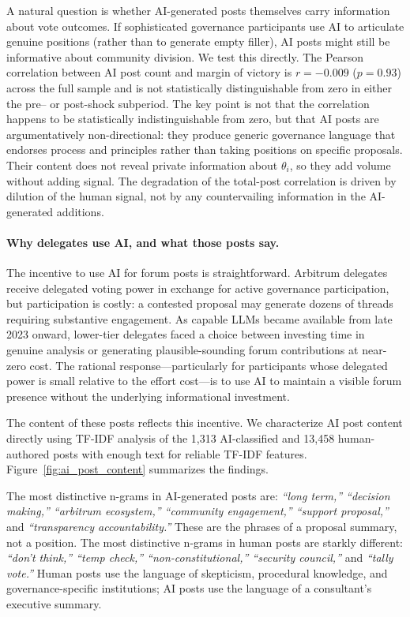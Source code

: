 \documentclass[12pt]{article}
\begin{document}
A natural question is whether AI-generated posts themselves carry information
about vote outcomes. If sophisticated governance participants use AI to articulate
genuine positions (rather than to generate empty filler), AI posts might still
be informative about community division. We test this directly. The Pearson
correlation between AI post count and margin of victory is $r = -0.009$
($p = 0.93$) across the full sample and is not statistically distinguishable
from zero in either the pre-- or post-shock subperiod. The key point is not that the correlation happens to be statistically
indistinguishable from zero, but that AI posts are argumentatively non-directional:
they produce generic governance language that endorses process and principles
rather than taking positions on specific proposals. Their content does not reveal
private information about $\theta_i$, so they add volume without adding signal.
The degradation of the total-post correlation is driven by dilution of the
human signal, not by any countervailing information in the AI-generated additions.

\paragraph{Why delegates use AI, and what those posts say.}
The incentive to use AI for forum posts is straightforward. Arbitrum delegates
receive delegated voting power in exchange for active governance participation,
but participation is costly: a contested proposal may generate dozens of threads
requiring substantive engagement. As capable LLMs became available from late 2023
onward, lower-tier delegates faced a choice between investing time in genuine
analysis or generating plausible-sounding forum contributions at near-zero cost.
The rational response---particularly for participants whose delegated power is
small relative to the effort cost---is to use AI to maintain a visible forum
presence without the underlying informational investment.

The content of these posts reflects this incentive. We characterize AI post
content directly using TF-IDF analysis of the 1,313 AI-classified and 13,458 human-authored posts with
enough text for reliable TF-IDF features. Figure~\ref{fig:ai_post_content}
summarizes the findings.

The most distinctive n-grams in AI-generated posts are: \textit{``long term,''
``decision making,'' ``arbitrum ecosystem,'' ``community engagement,''
``support proposal,''} and \textit{``transparency accountability.''} These are
the phrases of a proposal summary, not a position. The most distinctive n-grams
in human posts are starkly different: \textit{``don't think,'' ``temp check,''
``non-constitutional,'' ``security council,''} and \textit{``tally vote.''}
Human posts use the language of skepticism, procedural knowledge, and
governance-specific institutions; AI posts use the language of a consultant's
executive summary.
\end{document}
